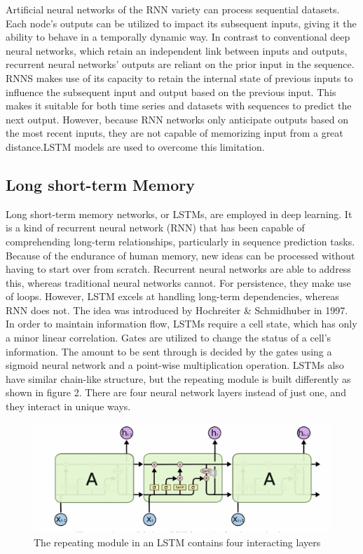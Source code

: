 \documentclass[letterpaper]{article}
\begin{document}
Artificial neural networks of the RNN variety can process sequential datasets. Each node's outputs can be utilized to impact its subsequent inputs, giving it the ability to behave in a temporally dynamic way. In contrast to conventional deep neural networks, which retain an independent link between inputs and outputs, recurrent neural networks' outputs are reliant on the prior input in the sequence. RNNS makes use of its capacity to retain the internal state of previous inputs to influence the subsequent input and output based on the previous input. This makes it suitable for both time series and datasets with sequences to predict the next output. However, because RNN networks only anticipate outputs based on the most recent inputs, they are not capable of memorizing input from a great distance.LSTM models are used to overcome this limitation.
\subsection{Long short-term Memory}

Long short-term memory networks, or LSTMs, are employed in deep learning. It is a kind of recurrent neural network (RNN) that has been capable of comprehending long-term relationships, particularly in sequence prediction tasks. Because of the endurance of human memory, new ideas can be processed without having to start over from scratch. Recurrent neural networks are able to address this, whereas traditional neural networks cannot. For persistence, they make use of loops. However, LSTM excels at handling long-term dependencies, whereas RNN does not. The idea was introduced by Hochreiter \& Schmidhuber in 1997.   In order to maintain information flow, LSTMs require a cell state, which has only a minor linear correlation. Gates are utilized to change the status of a cell's information. The amount to be sent through is decided by the gates using a sigmoid neural network and a point-wise multiplication operation. LSTMs also have similar chain-like structure, but the repeating module is built differently as shown in figure 2. There are four neural network layers instead of just one, and they interact in unique ways.
\begin{figure}
\centerline{\includegraphics[scale=.25]{LSTM.png}}
\caption{The repeating module in an LSTM contains four interacting layers}
\label{fig}
\end{figure}
\end{document}
